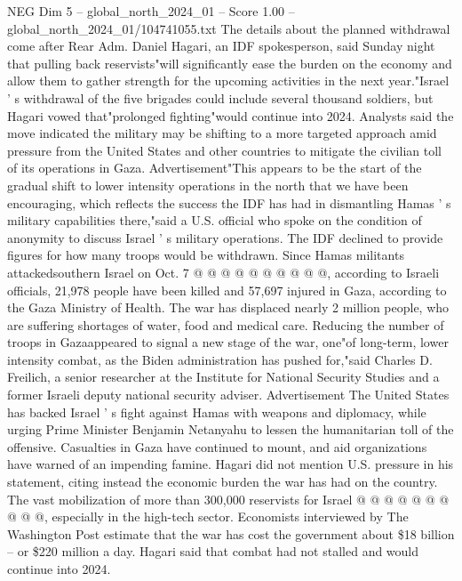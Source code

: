\begin{textsample}{NEG Dim 5 – global\_north\_2024\_01 – Score 1.00 – global\_north\_2024\_01/104741055.txt}  \label{ex:f5_neg_318}
The details about the planned withdrawal come after Rear Adm.
Daniel Hagari, an IDF spokesperson, said Sunday night that pulling back reservists"will significantly ease the burden on the economy and allow them to gather strength for the upcoming activities in the next year."Israel ' s withdrawal of the five brigades could include several thousand soldiers, but Hagari vowed that"prolonged fighting"would continue into 2024.
Analysts said the move indicated the military may be shifting to a more targeted approach amid pressure from the United States and other countries to mitigate the civilian toll of its operations in Gaza.
Advertisement"This appears to be the start of the gradual shift to lower intensity operations in the north that we have been encouraging, which reflects the success the IDF has had in dismantling Hamas ' s military capabilities there,"said a U.S. official who spoke on the condition of anonymity to discuss Israel ' s military operations.
The IDF declined to provide figures for how many troops would be withdrawn.
Since Hamas militants attackedsouthern Israel on Oct. 7 @ @ @ @ @ @ @ @ @ @, according to Israeli officials, 21,978 people have been killed and 57,697 injured in Gaza, according to the Gaza Ministry of Health.
The war has displaced nearly 2 million people, who are suffering shortages of water, food and medical care.
Reducing the number of troops in Gazaappeared to signal a new stage of the war, one"of long-term, lower intensity combat, as the Biden administration has pushed for,"said Charles D.
Freilich, a senior researcher at the Institute for National Security Studies and a former Israeli deputy national security adviser.
Advertisement The United States has backed Israel ' s fight against Hamas with weapons and diplomacy, while urging Prime Minister Benjamin Netanyahu to lessen the humanitarian toll of the offensive.
Casualties in Gaza have continued to mount, and aid organizations have warned of an impending famine.
Hagari did not mention U.S. pressure in his statement, citing instead the economic burden the war has had on the country.
The vast mobilization of more than 300,000 reservists for Israel @ @ @ @ @ @ @ @ @ @, especially in the high-tech sector.
Economists interviewed by The Washington Post estimate that the war has cost the government about \$18 billion -- or \$220 million a day.
Hagari said that combat had not stalled and would continue into 2024.

\end{textsample}
